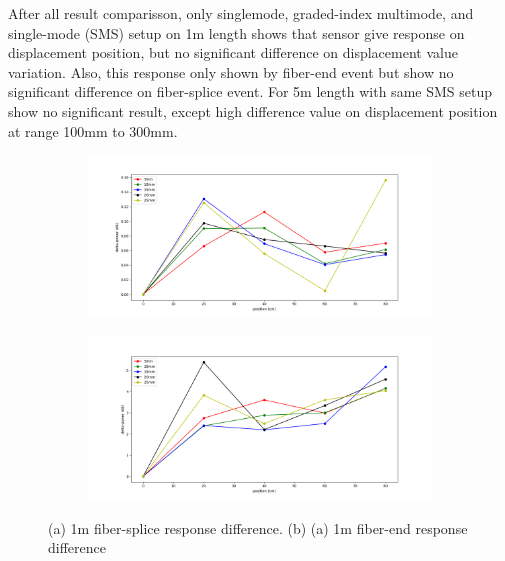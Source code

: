 \documentclass[a4paper,14pt]{article}
\begin{document}
After all result comparisson, only singlemode, graded-index multimode, and single-mode (SMS) setup on 1m length shows that sensor give response on displacement position, but no significant difference on displacement value variation.
Also, this response only shown by fiber-end event but show no significant difference on fiber-splice event.
For 5m length with same SMS setup show no significant result, except high difference value on displacement position at range 100mm to 300mm.
 

\begin{figure}[h!]
	\centering
	\captionsetup{justification=centering}
	\begin{subfigure}[b]{0.49\textwidth}
		\includegraphics[width=\textwidth]{images/splice_1}
		\caption{}
	\end{subfigure}
	\begin{subfigure}[b]{0.49\textwidth}
		\includegraphics[width=\textwidth]{images/end_1}
		\caption{}
	\end{subfigure}
	\caption[Setup Diagram]{\small{(a) 1m fiber-splice response difference. (b) (a) 1m fiber-end response difference}}
\end{figure}

\newpage
\end{document}
